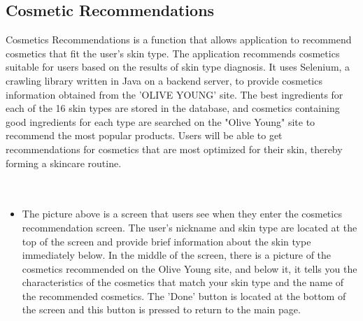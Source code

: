 \documentclass[conference]{IEEEtran}
\begin{document}
\subsection{Cosmetic Recommendations}
Cosmetics Recommendations is a function that allows application to recommend cosmetics that fit the user's skin type. The application recommends cosmetics suitable for users based on the results of skin type diagnosis. It uses Selenium, a crawling library written in Java on a backend server, to provide cosmetics information obtained from the 'OLIVE YOUNG' site. The best ingredients for each of the 16 skin types are stored in the database, and cosmetics containing good ingredients for each type are searched on the "Olive Young" site to recommend the most popular products. Users will be able to get recommendations for cosmetics that are most optimized for their skin, thereby forming a skincare routine. \\ \\ \\
\begin{itemize}
    \begin{figure}[h]
    \centering
    \texttt{[image: fig/HISKIN-20.jpg]}
    \label{fig:Cosmetic Recommendations Page}
    \caption{Cosmetic Recommendations Page} 
    \end{figure}
    \item[]The picture above is a screen that users see when they enter the cosmetics recommendation screen. The user's nickname and skin type are located at the top of the screen and provide brief information about the skin type immediately below. In the middle of the screen, there is a picture of the cosmetics recommended on the Olive Young site, and below it, it tells you the characteristics of the cosmetics that match your skin type and the name of the recommended cosmetics. The 'Done' button is located at the bottom of the screen and this button is pressed to return to the main page.
\end{itemize}
\end{document}
